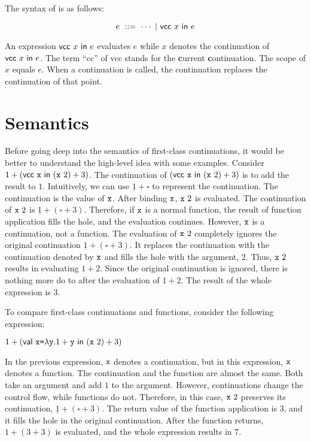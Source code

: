 The syntax of \lang is as follows:

\[
  e\ ::=\ \cdots\ |\ \evcc{x}{e}
\]

An expression $\textsf{vcc}\ x\ \textsf{in}\ e$ evaluates $e$ while $x$ denotes the
continuation of $\textsf{vcc}\ x\ \textsf{in}\ e$. The term ``\textsf{cc}'' of \textsf{vcc} stands
for the \textbf{\large c}urrent \textbf{\large c}ontinuation.
The scope of $x$ equals $e$. When a continuation
is called, the continuation replaces the continuation of that point.

\section{Semantics}

Before going deep into the semantics of first-class continuations, it would be
better to understand the high-level idea with some examples.
Consider $1+(\textsf{vcc}\ \texttt{x}\ \textsf{in}\ (\texttt{x}\ 2)+3)$. The
continuation of $(\evcc{\cx}{(\cx\ 2)+3})$ is to add the result to
$1$. Intuitively, we can use $\underline{1}+\square$ to represent the
continuation.
The continuation is the value of $\texttt{x}$. After binding $\texttt{x}$, $\cx\ 2$ is
evaluated. The continuation of $\cx\ 2$ is $\underline{1}+(\square+3)$.
Therefore, if $\texttt{x}$ is a normal function, the result of function application
fills the hole, and the evaluation continues. However, $\texttt{x}$ is a
continuation, not a function. The evaluation of $\cx\ 2$ completely ignores the original
continuation $\underline{1}+(\square+3)$. It replaces the continuation with
the continuation denoted by $\texttt{x}$ and fills the hole with the argument, $2$.
Thus, $\cx\ 2$ results in evaluating $1+2$. Since the original continuation is
ignored, there is nothing more do to after the evaluation of $1+2$. The result
of the whole expression is $3$.

To compare first-class continuations and functions, consider the following
expression:

$1+(\ebind{\cx}{\efun{\cy}{1+\cy}}{(\cx\ 2)+3})$

In the previous expression,
$\texttt{x}$ denotes a continuation, but in this expression, $\texttt{x}$ denotes a function.
The continuation and the function are almost the same. Both take an argument
and add $1$ to the argument. However, continuations change the control flow,
while functions do not. Therefore, in this case, $\cx\ 2$ preserves its continuation,
$\underline{1}+(\square+3)$. The return value of the function application is
$3$, and it fills the hole in the original continuation. After the function
returns, $1+(3+3)$ is evaluated, and the whole expression results in $7$.

